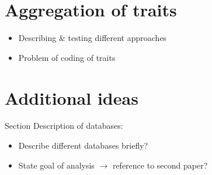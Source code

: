 \documentclass{article}
\begin{document}
\section{Aggregation of traits}

\begin{itemize}
    \item Describing \& testing different approaches
    \item Problem of coding of traits
\end{itemize}

\section*{Additional ideas}

Section Description of databases:
\begin{itemize}
    \item Describe different databases briefly?
    \item State goal of analysis $\rightarrow$ reference to second paper?
\end{itemize}
\end{document}
